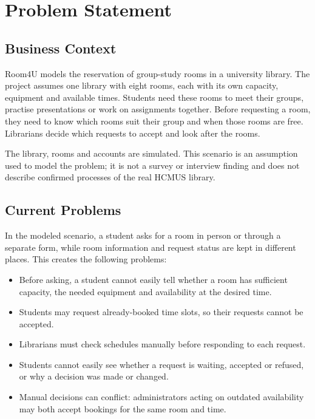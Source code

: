 \section{Problem Statement}

\subsection{Business Context}

Room4U models the reservation of group-study rooms in a university library. The project assumes one library with eight rooms, each with its own capacity, equipment and available times. Students need these rooms to meet their groups, practise presentations or work on assignments together. Before requesting a room, they need to know which rooms suit their group and when those rooms are free. Librarians decide which requests to accept and look after the rooms.

The library, rooms and accounts are simulated. This scenario is an assumption used to model the problem; it is not a survey or interview finding and does not describe confirmed processes of the real HCMUS library.

\subsection{Current Problems}

In the modeled scenario, a student asks for a room in person or through a separate form, while room information and request status are kept in different places. This creates the following problems:
\begin{itemize}[leftmargin=1.5em,itemsep=2pt,topsep=2pt]
  \item Before asking, a student cannot easily tell whether a room has sufficient capacity, the needed equipment and availability at the desired time.
  \item Students may request already-booked time slots, so their requests cannot be accepted.
  \item Librarians must check schedules manually before responding to each request.
  \item Students cannot easily see whether a request is waiting, accepted or refused, or why a decision was made or changed.
  \item Manual decisions can conflict: administrators acting on outdated availability may both accept bookings for the same room and time.
\end{itemize}

